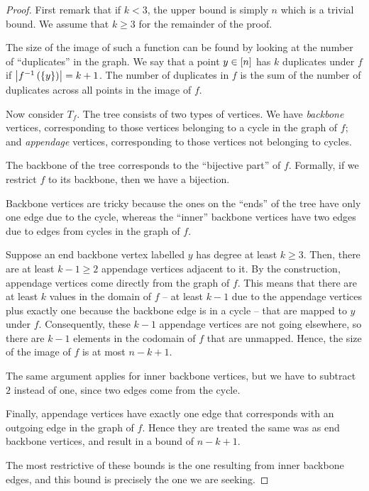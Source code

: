 \documentclass[11pt]{article}
\begin{document}
\begin{proof}
    First remark that if $k < 3$, the upper bound is simply $n$ which is a
    trivial bound. We assume that $k \geq 3$ for the remainder of the proof.

    The size of the image of such a function can be found by looking at the
    number of ``duplicates'' in the graph. We say that a point $y \in \left[n\right]$
    has $k$ duplicates under $f$ if $\left\lvert f^{-1}\left(\left\{y\right\}\right)\right\rvert = k + 1$.
    The number of duplicates in $f$ is the sum of the number of duplicates
    across all points in the image of $f$.

    Now consider $T_f$.
    The tree consists of two types of vertices.
    We have \emph{backbone} vertices, corresponding to those vertices belonging
    to a cycle in the graph of $f$; and \emph{appendage} vertices,
    corresponding to those vertices not belonging to cycles.

    The backbone of the tree corresponds to the ``bijective part'' of $f$.
    Formally, if we restrict $f$ to its backbone, then we have a bijection.

    Backbone vertices are tricky because the ones on the ``ends'' of the tree
    have only one edge due to the cycle, whereas the ``inner'' backbone
    vertices have two edges due to edges from cycles in the graph of $f$.

    Suppose an end backbone vertex labelled $y$ has degree at least $k \geq 3$.
    Then, there are at least $k - 1 \geq 2$ appendage vertices adjacent to it.
    By the construction, appendage vertices come directly from the graph of
    $f$.
    This means that there are at least $k$ values in the domain of $f$
    --
    at least $k-1$ due to the appendage vertices plus exactly one because the
    backbone edge is in a cycle
    --
    that are mapped to $y$ under $f$.
    Consequently, these $k-1$ appendage vertices are not going elsewhere, so
    there are $k-1$ elements in the codomain of $f$ that are unmapped.
    Hence, the size of the image of $f$ is at most $n - k + 1$.

    The same argument applies for inner backbone vertices, but we have to
    subtract $2$ instead of one, since two edges come from the cycle.

    Finally, appendage vertices have exactly one edge that corresponds with an
    outgoing edge in the graph of $f$. Hence they are treated the same was as
    end backbone vertices, and result in a bound of $n - k + 1$.

    The most restrictive of these bounds is the one resulting from inner
    backbone edges, and this bound is precisely the one we are seeking.
\end{proof}
\end{document}

